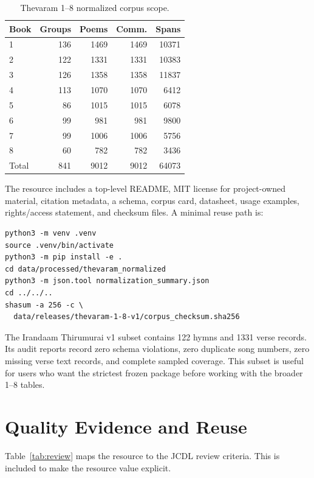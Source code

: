 \documentclass[sigconf]{acmart}
\begin{document}
\begin{table}[t]
  \caption{Thevaram 1--8 normalized corpus scope.}
  \label{tab:scope}
  \centering
  \small
  \begin{tabular}{lrrrr}
    \toprule
    Book & Groups & Poems & Comm. & Spans \\
    \midrule
    1 & 136 & 1469 & 1469 & 10371 \\
    2 & 122 & 1331 & 1331 & 10383 \\
    3 & 126 & 1358 & 1358 & 11837 \\
    4 & 113 & 1070 & 1070 & 6412 \\
    5 & 86 & 1015 & 1015 & 6078 \\
    6 & 99 & 981 & 981 & 9800 \\
    7 & 99 & 1006 & 1006 & 5756 \\
    8 & 60 & 782 & 782 & 3436 \\
    \midrule
    Total & 841 & 9012 & 9012 & 64073 \\
    \bottomrule
  \end{tabular}
\end{table}

The resource includes a top-level README, MIT license for project-owned material, citation metadata, a schema, corpus card, datasheet, usage examples, rights/access statement, and checksum files. A minimal reuse path is:

\begin{verbatim}
python3 -m venv .venv
source .venv/bin/activate
python3 -m pip install -e .
cd data/processed/thevaram_normalized
python3 -m json.tool normalization_summary.json
cd ../../..
shasum -a 256 -c \
  data/releases/thevaram-1-8-v1/corpus_checksum.sha256
\end{verbatim}

The Irandaam Thirumurai v1 subset contains 122 hymns and 1331 verse records. Its audit reports record zero schema violations, zero duplicate song numbers, zero missing verse text records, and complete sampled coverage. This subset is useful for users who want the strictest frozen package before working with the broader 1--8 tables.

\section{Quality Evidence and Reuse}

Table~\ref{tab:review} maps the resource to the JCDL review criteria. This is included to make the resource value explicit.
\end{document}
